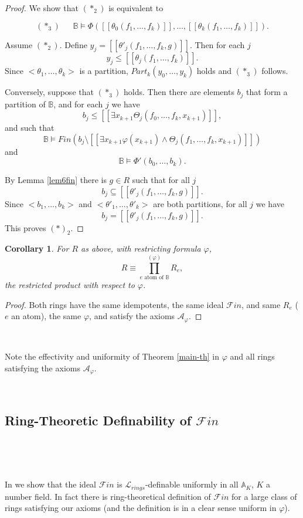 \documentclass[12pt]{amsart}
\def\A{\mathbb{A}}
\def\B{\mathbb{B}}
\def\cL{\mathcal{L}}
\def\A{\mathbb{A}}
\def\cL{\mathcal{L}}
\def\cA{\mathcal{A}}
\newtheorem{cor}{Corollary}[section]
\numberwithin{equation}{section}
\begin{document}
\begin{proof}
We show that $(*_2)$ is equivalent to 

$$(*_3)\ \ \ \ \ \  \ \B\models \Phi([[\theta_0(f_1,\dots,f_k)]],\dots,[[\theta_k(f_1,\dots,f_k)]]).$$

Assume $(*_2)$. Define $y_j=[[\theta'_j(f_1,\dots,f_k,g)]]$. Then for each $j$
$$y_j\leq [[\theta_j(f_1,\dots,f_k)]].$$
Since 
$<\theta_1,\dots,\theta_k>$ is a partition, $Part_k(y_0,\dots,y_k)$ holds and $(*_3)$ follows.
 
Conversely, suppose that $(*_3)$ holds. Then there are elements $b_j$ that form a partition of $\B$, and for each $j$ 
we have 
$$b_j \leq [[\exists x_{k+1} \Theta_j(f_0,\dots,f_k,x_{k+1})]],$$
and such that 
$$\B\models Fin(b_j\setminus [[\exists x_{k+1} \varphi(x_{k+1}) \wedge \Theta_j(f_1,\dots,f_k,x_{k+1})]])$$
and
$$\B \models \Phi'(b_0,\dots,b_k).$$

By Lemma \ref{lem6fin} there is $g\in R$ such that for all $j$
$$b_j\subseteq [[\theta'_j(f_1,\dots,f_k,g)]].$$
Since $<b_1,\dots,b_k>$ and $<\theta'_1,\dots,\theta'_k>$ are both partitions, for all $j$ we have
$$b_j=[[\theta'_j(f_1,\dots,f_k,g)]].$$
This proves $(*)_2$.


\end{proof}

\begin{cor} For $R$ as above, with restricting formula $\varphi$, 
$$R \equiv \prod_{e\text{~atom~of~}\B}^{(\varphi)} R_e,$$
the restricted product with respect to $\varphi$.\end{cor}
\begin{proof} Both rings have the same idempotents, the same ideal $\mathcal{F}in$, and same $R_e$ ($e$ an atom), the same $\varphi$, and satisfy the axioms $\cA_{\varphi}$.\end{proof}

\

Note the effectivity and uniformity of Theorem \ref{main-th} in $\varphi$ and all rings satisfying the axioms $\cA_{\varphi}$.

\

\subsection{Ring-Theoretic Definability of $\mathcal{F}in$}

\

\

In \cite{DM-ad} we show that the ideal $\mathcal{F}in$ is $\cL_{rings}$-definable uniformly in all $\A_K$, $K$ a number field. 
In fact there is ring-theoretical definition of $\mathcal{F}in$ for a large class of rings satisfying our axioms 
(and the definition is in a clear sense uniform in $\varphi$).
\end{document}
